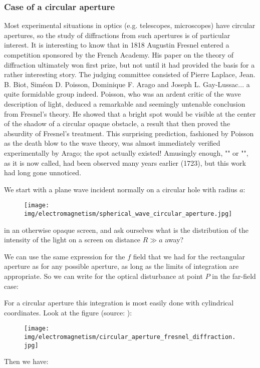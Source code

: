 	\subsubsection{Case of a circular aperture}\label{fresnel circular aperture}
	Most experimental situations in optics (e.g. telescopes, microscopes) have circular apertures, so the study of diffractions from such apertures is of particular interest. It is interesting to know that in 1818 Augustin Fresnel entered a competition sponsored by the French Academy. His paper on the theory of diffraction ultimately won first prize, but not until it had provided the basis for a rather interesting story. The judging committee consisted of Pierre Laplace, Jean. B. Biot, Siméon D. Poisson, Dominique F. Arago and Joseph L. Gay-Lussac... a quite formidable group indeed. Poisson, who was an ardent critic of the wave description of light, deduced a remarkable and seemingly untenable conclusion from Fresnel's theory. He showed that a bright spot would be visible at the center of the shadow of a circular opaque obstacle, a result that then proved the absurdity of Fresnel's treatment. This surprising prediction, fashioned by Poisson as the death blow to the wave theory, was almost immediately verified experimentally by Arago; the spot actually existed! Amusingly enough, "" or "", as it is now called, had been observed many years earlier (1723), but this work had long gone unnoticed.
	
	We start with a plane wave incident normally on a circular hole with radius $a$:
	\begin{figure}[H]
		\centering
		\texttt{[image: img/electromagnetism/spherical\_wave\_circular\_aperture.jpg]}
	\end{figure}
	in an otherwise opaque screen, and ask ourselves what is the distribution of the intensity of the light on a screen on distance $R \gg a$ away?
	
	We can use the same expression for the $f$ field that we had for the rectangular aperture as for any possible aperture, as long as the limits of integration are appropriate. So we can write for the optical disturbance at point $P$ in the far-field case:
	
	For a circular aperture this integration is most easily done with cylindrical coordinates. Look at the figure (source: \cite{hecht2016optics}):
	\begin{figure}[H]
		\centering
		\texttt{[image: img/electromagnetism/circular\_aperture\_fresnel\_diffraction.jpg]}
	\end{figure}
	Then we have:
	

